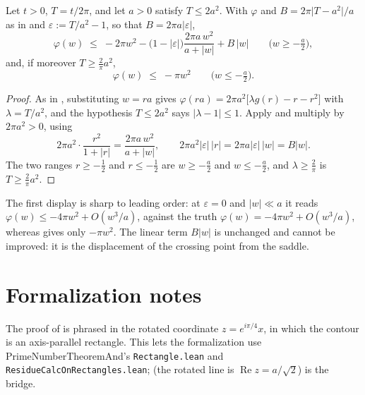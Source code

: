 \begin{lemma}
\label{lem:rs_phase_sharp}
\leanok
{}
Let $t>0$, $T=t/2\pi$, and let $a>0$ satisfy $T\le2a^{2}$.  With $\varphi$ and
$B=2\pi\lvert T-a^{2}\rvert/a$ as in  and
$\varepsilon:=T/a^{2}-1$, so that $B=2\pi a\lvert\varepsilon\rvert$,
\[
  \varphi(w)\;\le\;-2\pi w^{2}
    -\bigl(1-\lvert\varepsilon\rvert\bigr)\frac{2\pi a\,w^{2}}{a+\lvert w\rvert}
    +B\,\lvert w\rvert
  \qquad\bigl(w\ge-\tfrac a2\bigr),
\]
and, if moreover $T\ge\tfrac2\pi a^{2}$,
\[
  \varphi(w)\;\le\;-\pi w^{2}\qquad\bigl(w\le-\tfrac a2\bigr).
\]
\end{lemma}

\begin{proof}
\leanok
{}
As in , substituting $w=ra$ gives
$\varphi(ra)=2\pi a^{2}\bigl[\lambda g(r)-r-r^{2}\bigr]$ with $\lambda=T/a^{2}$, and the
hypothesis $T\le2a^{2}$ says $\lvert\lambda-1\rvert\le1$.  Apply
 and multiply by $2\pi a^{2}>0$, using
\[
  2\pi a^{2}\cdot\frac{r^{2}}{1+\lvert r\rvert}=\frac{2\pi a\,w^{2}}{a+\lvert w\rvert},
  \qquad
  2\pi a^{2}\lvert\varepsilon\rvert\,\lvert r\rvert=2\pi a\lvert\varepsilon\rvert\,\lvert w\rvert
   =B\lvert w\rvert .
\]
The two ranges $r\ge-\tfrac12$ and $r\le-\tfrac12$ are $w\ge-\tfrac a2$ and $w\le-\tfrac a2$,
and $\lambda\ge\tfrac2\pi$ is $T\ge\tfrac2\pi a^{2}$.
\end{proof}

The first display is sharp to leading order: at $\varepsilon=0$ and $\lvert w\rvert\ll a$ it
reads $\varphi(w)\le-4\pi w^{2}+O(w^{3}/a)$, against the truth $\varphi(w)=-4\pi w^{2}+O(w^{3}/a)$,
whereas  gives only $-\pi w^{2}$.  The linear term $B\lvert w\rvert$ is
unchanged and cannot be improved: it is the displacement of the crossing point from the
saddle.

\section{Formalization notes}
\label{sec:rs_formalization}

\begin{remark}[Rectangles]
\label{rem:rs_rectangles}
The proof of  is phrased in the rotated coordinate
$z=e^{i\pi/4}x$, in which the contour is an axis-parallel rectangle.  This lets
the formalization use PrimeNumberTheoremAnd's \texttt{Rectangle.lean} and
\texttt{ResidueCalcOnRectangles.lean};
 (the rotated line is $\operatorname{Re}z=a/\sqrt2$) is the bridge.
\end{remark}

